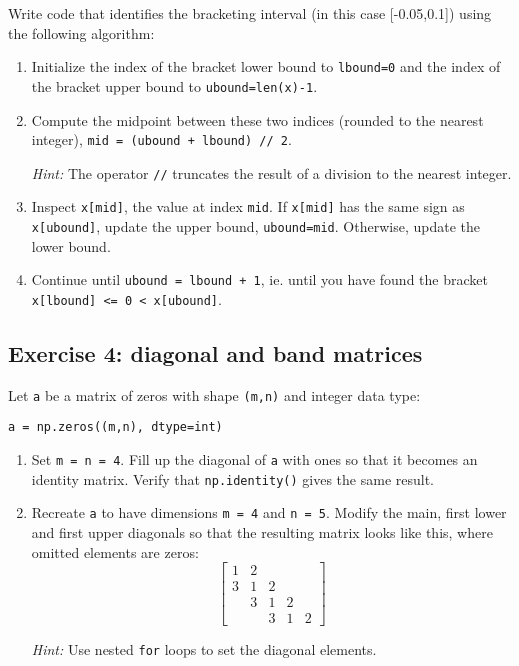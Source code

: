 \documentclass[10pt]{scrartcl}
\begin{document}
    Write code that identifies the bracketing interval (in this case
{[}-0.05,0.1{]}) using the following algorithm:

\begin{enumerate}
\def\labelenumi{\arabic{enumi}.}
\item
  Initialize the index of the bracket lower bound to \texttt{lbound=0}
  and the index of the bracket upper bound to \texttt{ubound=len(x)-1}.
\item
  Compute the midpoint between these two indices (rounded to the nearest
  integer), \texttt{mid\ =\ (ubound\ +\ lbound)\ //\ 2}.

  \emph{Hint:} The operator \texttt{//} truncates the result of a
  division to the nearest integer.
\item
  Inspect \texttt{x{[}mid{]}}, the value at index \texttt{mid}. If
  \texttt{x{[}mid{]}} has the same sign as \texttt{x{[}ubound{]}},
  update the upper bound, \texttt{ubound=mid}. Otherwise, update the
  lower bound.
\item
  Continue until \texttt{ubound\ =\ lbound\ +\ 1}, ie. until you have
  found the bracket
  \texttt{x{[}lbound{]}\ \textless{}=\ 0\ \textless{}\ x{[}ubound{]}}.
\end{enumerate}

    \hypertarget{exercise-4-diagonal-and-band-matrices}{%
\subsection{Exercise 4: diagonal and band
matrices}\label{exercise-4-diagonal-and-band-matrices}}

Let \texttt{a} be a matrix of zeros with shape \texttt{(m,n)} and
integer data type:

\begin{verbatim}
a = np.zeros((m,n), dtype=int)
\end{verbatim}

\begin{enumerate}
\def\labelenumi{\arabic{enumi}.}
\item
  Set \texttt{m\ =\ n\ =\ 4}. Fill up the diagonal of \texttt{a} with
  ones so that it becomes an identity matrix. Verify that
  \texttt{np.identity()} gives the same result.
\item
  Recreate \texttt{a} to have dimensions \texttt{m\ =\ 4} and
  \texttt{n\ =\ 5}. Modify the main, first lower and first upper
  diagonals so that the resulting matrix looks like this, where omitted
  elements are zeros: \[
  \begin{bmatrix}
  1 & 2 &   &   & \\
  3 & 1 & 2 &   & \\
    & 3 & 1 & 2 & \\
    &   & 3 & 1 & 2
  \end{bmatrix}
  \]

  \emph{Hint:} Use nested \texttt{for} loops to set the diagonal
  elements.
\end{enumerate}
\end{document}
